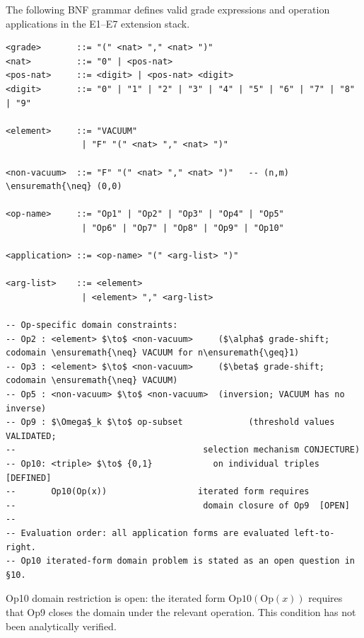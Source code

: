 



\medskip
The following BNF grammar defines valid grade expressions and operation
applications in the E1--E7 extension stack.

\begin{verbatim}
<grade>       ::= "(" <nat> "," <nat> ")"
<nat>         ::= "0" | <pos-nat>
<pos-nat>     ::= <digit> | <pos-nat> <digit>
<digit>       ::= "0" | "1" | "2" | "3" | "4" | "5" | "6" | "7" | "8" | "9"

<element>     ::= "VACUUM"
               | "F" "(" <nat> "," <nat> ")"

<non-vacuum>  ::= "F" "(" <nat> "," <nat> ")"   -- (n,m) \ensuremath{\neq} (0,0)

<op-name>     ::= "Op1" | "Op2" | "Op3" | "Op4" | "Op5"
               | "Op6" | "Op7" | "Op8" | "Op9" | "Op10"

<application> ::= <op-name> "(" <arg-list> ")"

<arg-list>    ::= <element>
               | <element> "," <arg-list>

-- Op-specific domain constraints:
-- Op2 : <element> $\to$ <non-vacuum>     ($\alpha$ grade-shift; codomain \ensuremath{\neq} VACUUM for n\ensuremath{\geq}1)
-- Op3 : <element> $\to$ <non-vacuum>     ($\beta$ grade-shift; codomain \ensuremath{\neq} VACUUM)
-- Op5 : <non-vacuum> $\to$ <non-vacuum>  (inversion; VACUUM has no inverse)
-- Op9 : $\Omega$_k $\to$ op-subset             (threshold values VALIDATED;
--                                     selection mechanism CONJECTURE)
-- Op10: <triple> $\to$ {0,1}            on individual triples  [DEFINED]
--       Op10(Op(x))                  iterated form requires
--                                     domain closure of Op9  [OPEN]
--
-- Evaluation order: all application forms are evaluated left-to-right.
-- Op10 iterated-form domain problem is stated as an open question in §10.
\end{verbatim}

\begin{remark}
Op10 domain restriction is open: the iterated form
$\mathrm{Op10}(\mathrm{Op}(x))$ requires that Op9 closes the domain under the
relevant operation. This condition has not been analytically verified.
\end{remark}

